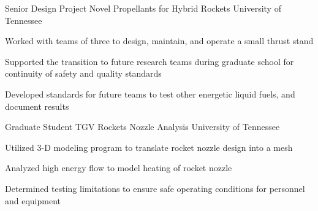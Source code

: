 
\begin{cventries}
  \cventry
    {Senior Design Project} %
    {Novel Propellants for Hybrid Rockets} %
    {University of Tennessee} %
    {} %
    {
      \begin{cvitems} %
        \item {Worked with teams of three to design, maintain, and operate a small thrust stand}
		\item {Supported the transition to future research teams during graduate school for continuity of safety and quality standards}
		\item {Developed standards for future teams to test other energetic liquid fuels, and document results}
      \end{cvitems}
    }

  \cventry
    {Graduate Student} %
    {TGV Rockets Nozzle Analysis } %
    {University of Tennessee} %
    {} %
    {
      \begin{cvitems} %
      	\item {Utilized 3-D modeling program to translate rocket nozzle design into a mesh}
		\item {Analyzed high energy flow to model heating of rocket nozzle}
		\item {Determined testing limitations to ensure safe operating conditions for personnel and equipment }
      \end{cvitems}
    }
\end{cventries}